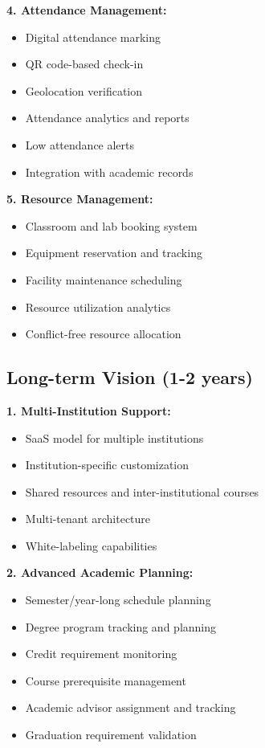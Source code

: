 \textbf{4. Attendance Management:}
\begin{itemize}
    \item Digital attendance marking
    \item QR code-based check-in
    \item Geolocation verification
    \item Attendance analytics and reports
    \item Low attendance alerts
    \item Integration with academic records
\end{itemize}

\textbf{5. Resource Management:}
\begin{itemize}
    \item Classroom and lab booking system
    \item Equipment reservation and tracking
    \item Facility maintenance scheduling
    \item Resource utilization analytics
    \item Conflict-free resource allocation
\end{itemize}

\subsection{Long-term Vision (1-2 years)}

\textbf{1. Multi-Institution Support:}
\begin{itemize}
    \item SaaS model for multiple institutions
    \item Institution-specific customization
    \item Shared resources and inter-institutional courses
    \item Multi-tenant architecture
    \item White-labeling capabilities
\end{itemize}

\textbf{2. Advanced Academic Planning:}
\begin{itemize}
    \item Semester/year-long schedule planning
    \item Degree program tracking and planning
    \item Credit requirement monitoring
    \item Course prerequisite management
    \item Academic advisor assignment and tracking
    \item Graduation requirement validation
\end{itemize}

